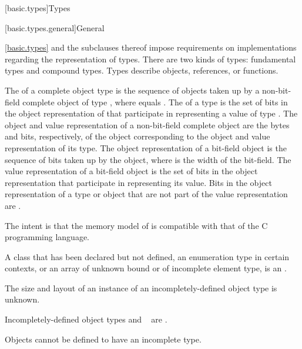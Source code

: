 [basic.types]{Types}%

[basic.types.general]{General}%

\pnum
\begin{note}
\ref{basic.types} and the subclauses thereof
impose requirements on implementations regarding the representation
of types.
There are two kinds of types: fundamental types and compound types.
Types describe objects,
references,
or functions.
\end{note}

\pnum
\label{term.object.representation}%
The 
of a complete object type  is the
sequence of   objects taken up
by a non-bit-field complete object of type ,
where  equals
.
The 
of a type  is the set of bits
in the object representation of 
that participate in representing a value of type .
The object and value representation of
a non-bit-field complete object are
the bytes and bits, respectively, of
the object corresponding to the object and value representation of its type.
The object representation of a bit-field object is
the sequence of  bits taken up by the object,
where  is the width of the bit-field.
The value representation of a bit-field object is
the set of bits in the object representation that
participate in representing its value.
\label{term.padding.bits}%
Bits in the object representation of a type or object that are
not part of the value representation
are .
\begin{footnote}
The intent is that the memory model of \Cpp{} is compatible
with that of the C programming language.
\end{footnote}

\pnum
{}%
A class that has been declared but not defined, an enumeration type in certain
contexts, or an array of unknown
bound or of incomplete element type, is an
.
\begin{footnote}
The size and layout of an instance of an incompletely-defined
object type is unknown.
\end{footnote}
\label{term.incomplete.type}%
Incompletely-defined object types and \cv{}~ are
.
\begin{note}
Objects cannot be defined to have an incomplete type.
\end{note}

